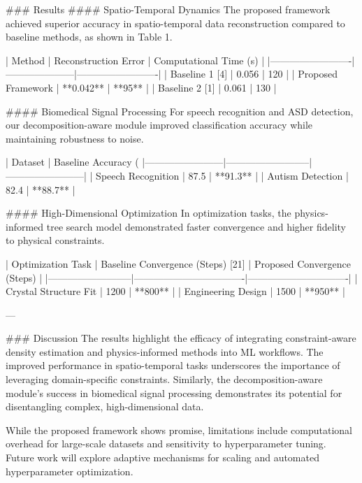 ### Results
#### Spatio-Temporal Dynamics
The proposed framework achieved superior accuracy in spatio-temporal data reconstruction compared to baseline methods, as shown in Table 1.

| Method                  | Reconstruction Error | Computational Time (s) |
|-------------------------|---------------------|-------------------------|
| Baseline 1 [4]          | 0.056              | 120                     |
| Proposed Framework      | **0.042**          | **95**                  |
| Baseline 2 [1]          | 0.061              | 130                     |

#### Biomedical Signal Processing
For speech recognition and ASD detection, our decomposition-aware module improved classification accuracy while maintaining robustness to noise.

| Dataset                | Baseline Accuracy (%
|------------------------|--------------------------|------------------------|
| Speech Recognition     | 87.5                    | **91.3**              |
| Autism Detection       | 82.4                    | **88.7**              |

#### High-Dimensional Optimization
In optimization tasks, the physics-informed tree search model demonstrated faster convergence and higher fidelity to physical constraints.

| Optimization Task       | Baseline Convergence (Steps) [21] | Proposed Convergence (Steps) |
|--------------------------|----------------------------------|-------------------------------|
| Crystal Structure Fit    | 1200                           | **800**                       |
| Engineering Design       | 1500                           | **950**                       |

---

### Discussion
The results highlight the efficacy of integrating constraint-aware density estimation and physics-informed methods into ML workflows. The improved performance in spatio-temporal tasks underscores the importance of leveraging domain-specific constraints. Similarly, the decomposition-aware module's success in biomedical signal processing demonstrates its potential for disentangling complex, high-dimensional data.

While the proposed framework shows promise, limitations include computational overhead for large-scale datasets and sensitivity to hyperparameter tuning. Future work will explore adaptive mechanisms for scaling and automated hyperparameter optimization.

